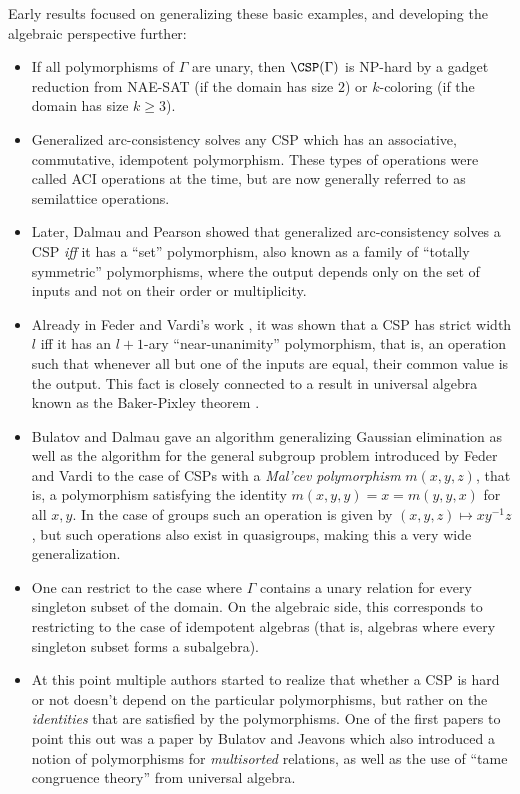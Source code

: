Early results focused on generalizing these basic examples, and developing the algebraic perspective further:
\begin{itemize}
\item If all polymorphisms of $\Gamma$ are unary, then $\CSP(\Gamma)$ is NP-hard by a gadget reduction from NAE-SAT (if the domain has size $2$) or $k$-coloring (if the domain has size $k \ge 3$).

\item Generalized arc-consistency solves any CSP which has an associative, commutative, idempotent polymorphism. These types of operations were called ACI operations at the time, but are now generally referred to as semilattice operations.

\item Later, Dalmau and Pearson \cite{dalmau-width-1} showed that generalized arc-consistency solves a CSP \emph{iff} it has a ``set'' polymorphism, also known as a family of ``totally symmetric'' polymorphisms, where the output depends only on the set of inputs and not on their order or multiplicity.

\item Already in Feder and Vardi's work \cite{feder-vardi}, it was shown that a CSP has strict width $l$ iff it has an $l+1$-ary ``near-unanimity'' polymorphism, that is, an operation such that whenever all but one of the inputs are equal, their common value is the output. This fact is closely connected to a result in universal algebra known as the Baker-Pixley theorem \cite{baker-pixley}.

\item Bulatov and Dalmau \cite{bulatov-dalmau-malcev} gave an algorithm generalizing Gaussian elimination as well as the algorithm for the general subgroup problem introduced by Feder and Vardi to the case of CSPs with a \emph{Mal'cev polymorphism} $m(x,y,z)$, that is, a polymorphism satisfying the identity $m(x,y,y) = x = m(y,y,x)$ for all $x,y$. In the case of groups such an operation is given by $(x,y,z) \mapsto xy^{-1}z$, but such operations also exist in quasigroups, making this a very wide generalization.

\item One can restrict to the case where $\Gamma$ contains a unary relation for every singleton subset of the domain. On the algebraic side, this corresponds to restricting to the case of idempotent algebras (that is, algebras where every singleton subset forms a subalgebra).

\item At this point multiple authors started to realize that whether a CSP is hard or not doesn't depend on the particular polymorphisms, but rather on the \emph{identities} that are satisfied by the polymorphisms. One of the first papers to point this out was a paper by Bulatov and Jeavons \cite{bulatov-jeavons-varieties} which also introduced a notion of polymorphisms for \emph{multisorted} relations, as well as the use of ``tame congruence theory'' from universal algebra.


\end{itemize}
